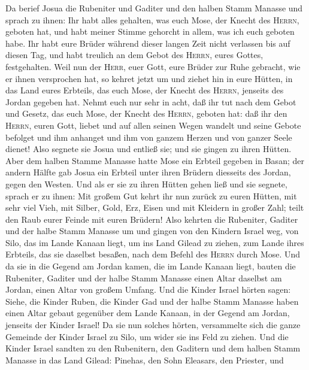  Da berief Josua die Rubeniter und Gaditer und den halben
Stamm Manasse und sprach zu ihnen:  Ihr habt alles
gehalten, was euch Mose, der Knecht des \textsc{Herrn}, geboten hat, und
habt meiner Stimme gehorcht in allem, was ich euch geboten habe.
 Ihr habt eure Brüder während dieser langen Zeit nicht
verlassen bis auf diesen Tag, und habt treulich an dem Gebot des
\textsc{Herrn}, eures Gottes, festgehalten.  Weil nun der
\textsc{Herr}, euer Gott, eure Brüder zur Ruhe gebracht, wie er ihnen
versprochen hat, so kehret jetzt um und ziehet hin in eure Hütten, in
das Land eures Erbteils, das euch Mose, der Knecht des \textsc{Herrn},
jenseits des Jordan gegeben hat.  Nehmt euch nur sehr in
acht, daß ihr tut nach dem Gebot und Gesetz, das euch Mose, der Knecht
des \textsc{Herrn}, geboten hat: daß ihr den \textsc{Herrn}, euren Gott,
liebet und auf allen seinen Wegen wandelt und seine Gebote befolget und
ihm anhanget und ihm von ganzem Herzen und von ganzer Seele dienet!
 Also segnete sie Josua und entließ sie; und sie gingen zu
ihren Hütten.  Aber dem halben Stamme Manasse hatte Mose
ein Erbteil gegeben in Basan; der andern Hälfte gab Josua ein Erbteil
unter ihren Brüdern diesseits des Jordan, gegen den Westen.
 Und als er sie zu ihren Hütten gehen ließ und sie
segnete, sprach er zu ihnen: Mit großem Gut kehrt ihr nun zurück zu
euren Hütten, mit sehr viel Vieh, mit Silber, Gold, Erz, Eisen und mit
Kleidern in großer Zahl; teilt den Raub eurer Feinde mit euren Brüdern!
 Also kehrten die Rubeniter, Gaditer und der halbe Stamm
Manasse um und gingen von den Kindern Israel weg, von Silo, das im Lande
Kanaan liegt, um ins Land Gilead zu ziehen, zum Lande ihres Erbteils,
das sie daselbst besaßen, nach dem Befehl des \textsc{Herrn} durch Mose.
 Und da sie in die Gegend am Jordan kamen, die im Lande
Kanaan liegt, bauten die Rubeniter, Gaditer und der halbe Stamm Manasse
einen Altar daselbst am Jordan, einen Altar von großem Umfang.
 Und die Kinder Israel hörten sagen: Siehe, die Kinder
Ruben, die Kinder Gad und der halbe Stamm Manasse haben einen Altar
gebaut gegenüber dem Lande Kanaan, in der Gegend am Jordan, jenseits der
Kinder Israel!  Da sie nun solches hörten, versammelte
sich die ganze Gemeinde der Kinder Israel zu Silo, um wider sie ins Feld
zu ziehen.  Und die Kinder Israel sandten zu den
Rubenitern, den Gaditern und dem halben Stamm Manasse in das Land
Gilead: Pinehas, den Sohn Eleasars, den Priester,  und
